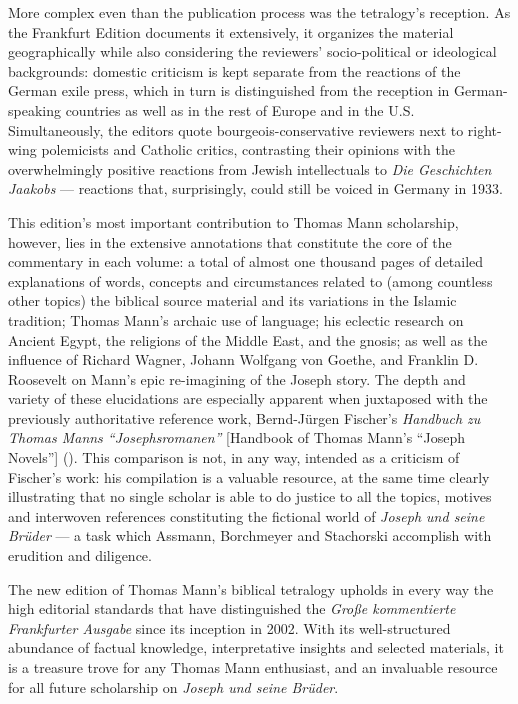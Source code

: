 \begin{review}
More complex even than the publication process was the tetralogy's
reception. As the Frankfurt Edition documents it extensively, it
organizes the material geographically while also considering the
reviewers' socio-political or ideological backgrounds: domestic
criticism is kept separate from the reactions of the German exile press,
which in turn is distinguished from the reception in German-speaking
countries as well as in the rest of Europe and in the U.S.
Simultaneously, the editors quote bourgeois-conservative reviewers next
to right-wing polemicists and Catholic critics, contrasting their
opinions with the overwhelmingly positive reactions from Jewish
intellectuals to \emph{Die Geschichten Jaakobs} --- reactions that,
surprisingly, could still be voiced in Germany in 1933.

This edition's most important contribution to Thomas Mann scholarship,
however, lies in the extensive annotations that constitute the core of
the commentary in each volume: a total of almost one thousand pages of
detailed explanations of words, concepts and circumstances related to
(among countless other topics) the biblical source material and its
variations in the Islamic tradition; Thomas Mann's archaic use of
language; his eclectic research on Ancient Egypt, the religions of the
Middle East, and the gnosis; as well as the influence of Richard Wagner,
Johann Wolfgang von Goethe, and Franklin D. Roosevelt on Mann's epic
re-imagining of the Joseph story. The depth and variety of these
elucidations are especially apparent when juxtaposed with the previously
authoritative reference work, Bernd-Jürgen Fischer's \emph{Handbuch zu
Thomas Manns ``Josephsromanen''} {[}Handbook of Thomas Mann's
``Joseph Novels''{]} (\citeyear{fischer_handbuch_2002}). This comparison is not, in any way,
intended as a criticism of Fischer's work: his compilation is a valuable
resource, at the same time clearly illustrating that no single scholar
is able to do justice to all the topics, motives and interwoven
references constituting the fictional world of \emph{Joseph und seine
Brüder} --- a task which Assmann, Borchmeyer and Stachorski accomplish
with erudition and diligence.

The new edition of Thomas Mann's biblical tetralogy upholds in every way
the high editorial standards that have distinguished the \emph{Große
kommentierte Frankfurter Ausgabe} since its inception in 2002. With its
well-structured abundance of factual knowledge, interpretative insights
and selected materials, it is a treasure trove for any Thomas Mann
enthusiast, and an invaluable resource for all future scholarship on
\emph{Joseph und seine Brüder}.

\begin{flushleft}
  
\end{flushleft}

\end{review}